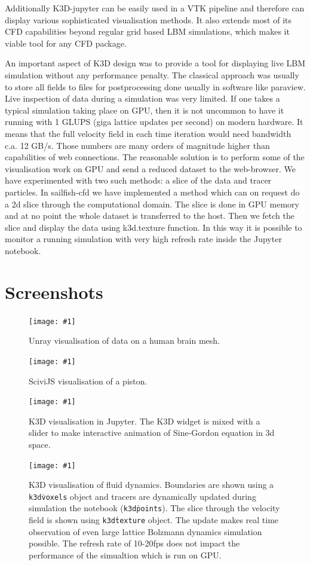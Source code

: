 \documentclass{deliverablereport}
\newcommand{\screenshot}[2]{
\begin{figure}[ht]
  \texttt{[image: \#1]}
  \caption{#2}
  \label{#1}
\end{figure}}
\begin{document}
Additionally K3D-jupyter can be easily used in a VTK pipeline and
therefore can display various sophisticated visualisation
methods. It also extends most of its CFD capabilities beyond regular
grid based LBM simulations, which makes it viable tool for any CFD
package.

An important aspect of K3D design was to provide a tool for
displaying live LBM simulation without any performance penalty. The
classical approach was usually to store all fields to files for
postprocessing done usually in software like paraview. Live inspection
of data during a simulation was very limited.  If one takes a typical
simulation taking place on GPU, then it is not uncommon to have it
running with 1 GLUPS (giga lattice updates per second) on modern
hardware. It means that the full velocity field in each time iteration
would need bandwidth c.a. 12 GB/s. Those numbers are many orders of
magnitude higher than capabilities of web connections.  The reasonable
solution is to perform some of the visualisation work on GPU and send a reduced
dataset to the web-browser. We have experimented with two such
methods: a slice of the data and tracer particles. In sailfish-cfd we
have implemented a method which can on request do a 2d slice through
the computational domain. The slice is done in GPU memory and at no
point the whole dataset is transferred to the host. Then we fetch the
slice and display the data using k3d.texture function. In this way it
is possible to monitor a running simulation with very high refresh
rate inside the Jupyter notebook.



\clearpage
\appendix
\section{Screenshots}\label{screenshots}

\screenshot{unray-brain.png}{Unray visualisation of data on a human brain mesh.}
\screenshot{scivijs.png}{SciviJS visualisation of a piston.}

\screenshot{k3d_3.png}{K3D visualisation in Jupyter. The K3D widget is
  mixed with a slider to make interactive animation of Sine-Gordon
  equation in 3d space.}

\screenshot{k3d_cfd3.png}{K3D visualisation of fluid
  dynamics. Boundaries are shown using a \texttt{k3d\.voxels} object
  and tracers are dynamically updated during simulation the notebook
  (\texttt{k3d\.points}). The slice through the velocity field is shown
  using \texttt{k3d\.texture} object.  The update makes real time
  observation of even large lattice Bolzmann dynamics simulation
  possible. The refresh rate of 10-20fps does not impact the
  performance of the simualtion which is run on GPU. }
\end{document}
